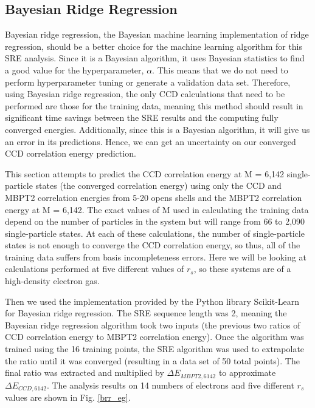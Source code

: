 \subsection*{Bayesian Ridge Regression}

Bayesian ridge regression, the Bayesian machine learning implementation of ridge regression, should be a better choice for the machine learning algorithm for this SRE analysis. Since it is a Bayesian algorithm, it uses Bayesian statistics to find a good value for the hyperparameter, $\alpha$. This means that we do not need to perform hyperparameter tuning or generate a validation data set. Therefore, using Bayesian ridge regression, the only CCD calculations that need to be performed are those for the training data, meaning this method should result in significant time savings between the SRE results and the computing fully converged energies. Additionally, since this is a Bayesian algorithm, it will give us an error in its predictions. Hence, we can get an uncertainty on our converged CCD correlation energy prediction.

This section attempts to predict the CCD correlation energy at M = 6,142 single-particle states (the converged correlation energy) using only the CCD and MBPT2 correlation energies from 5-20 opens shells and the MBPT2 correlation energy at M = 6,142. The exact values of M used in calculating the training data depend on the number of particles in the system but will range from 66 to 2,090 single-particle states. At each of these calculations, the number of single-particle states is not enough to converge the CCD correlation energy, so thus, all of the training data suffers from basis incompleteness errors. Here we will be looking at calculations performed at five different values of $r_s$, so these systems are of a high-density electron gas.

Then we used the implementation provided by the Python library Scikit-Learn for Bayesian ridge regression. The SRE sequence length was 2, meaning the Bayesian ridge regression algorithm took two inputs (the previous two ratios of CCD correlation energy to MBPT2 correlation energy). Once the algorithm was trained using the 16 training points, the SRE algorithm was used to extrapolate the ratio until it was converged (resulting in a data set of 50 total points). The final ratio was extracted and multiplied by $\Delta E_{MBPT2, 6142}$ to approximate $\Delta E_{CCD, 6142}$. The analysis results on 14 numbers of electrons and five different $r_s$ values are shown in Fig. \ref{brr_eg}.

